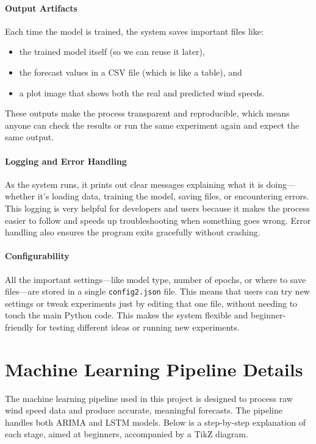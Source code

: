 \paragraph{Output Artifacts} 
Each time the model is trained, the system saves important files like:
\begin{itemize}
	\item the trained model itself (so we can reuse it later),
	\item the forecast values in a CSV file (which is like a table), and
	\item a plot image that shows both the real and predicted wind speeds.
\end{itemize}
These outputs make the process transparent and reproducible, which means anyone can check the results or run the same experiment again and expect the same output.

\paragraph{Logging and Error Handling} 
As the system runs, it prints out clear messages explaining what it is doing—whether it’s loading data, training the model, saving files, or encountering errors. This logging is very helpful for developers and users because it makes the process easier to follow and speeds up troubleshooting when something goes wrong. Error handling also ensures the program exits gracefully without crashing.

\paragraph{Configurability} 
All the important settings—like model type, number of epochs, or where to save files—are stored in a single \texttt{config2.json} file. This means that users can try new settings or tweak experiments just by editing that one file, without needing to touch the main Python code. This makes the system flexible and beginner-friendly for testing different ideas or running new experiments.


\section{Machine Learning Pipeline Details}

The machine learning pipeline used in this project is designed to process raw wind speed data and produce accurate, meaningful forecasts. The pipeline handles both ARIMA and LSTM models. Below is a step-by-step explanation of each stage, aimed at beginners, accompanied by a TikZ diagram.

